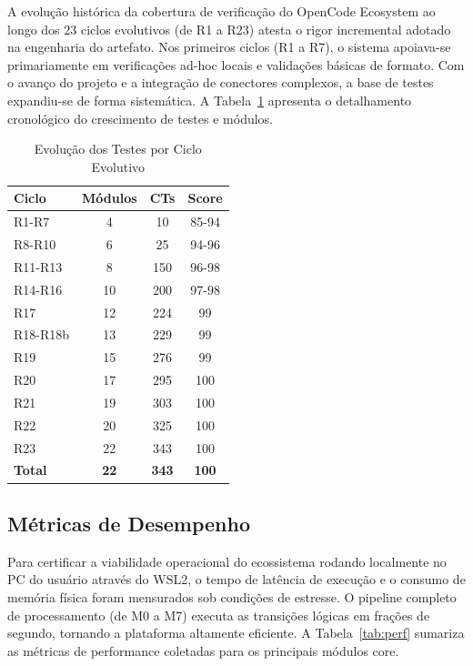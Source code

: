 \documentclass[12pt,a4paper,oneside]{abntex2}
\begin{document}
A evolução histórica da cobertura de verificação do OpenCode Ecosystem ao longo dos 23 ciclos evolutivos (de R1 a R23) atesta o rigor incremental adotado na engenharia do artefato. Nos primeiros ciclos (R1 a R7), o sistema apoiava-se primariamente em verificações ad-hoc locais e validações básicas de formato. Com o avanço do projeto e a integração de conectores complexos, a base de testes expandiu-se de forma sistemática. A Tabela~\ref{tab:evolucao} apresenta o detalhamento cronológico do crescimento de testes e módulos.

\begin{table}[H]
\centering
\small
\caption{Evolução dos Testes por Ciclo Evolutivo}
\label{tab:evolucao}
\begin{tabular}{lccc}
\toprule
\textbf{Ciclo} & \textbf{Módulos} & \textbf{CTs} & \textbf{Score} \\
\midrule
R1-R7 & 4 & 10 & 85-94 \\
R8-R10 & 6 & 25 & 94-96 \\
R11-R13 & 8 & 150 & 96-98 \\
R14-R16 & 10 & 200 & 97-98 \\
R17 & 12 & 224 & 99 \\
R18-R18b & 13 & 229 & 99 \\
R19 & 15 & 276 & 99 \\
R20 & 17 & 295 & 100 \\
R21 & 19 & 303 & 100 \\
R22 & 20 & 325 & 100 \\
R23 & 22 & 343 & 100 \\
\midrule
\textbf{Total} & \textbf{22} & \textbf{343} & \textbf{100} \\
\bottomrule
\end{tabular}
\end{table}

\subsection{Métricas de Desempenho}

Para certificar a viabilidade operacional do ecossistema rodando localmente no PC do usuário através do WSL2, o tempo de latência de execução e o consumo de memória física foram mensurados sob condições de estresse. O pipeline completo de processamento (de M0 a M7) executa as transições lógicas em frações de segundo, tornando a plataforma altamente eficiente. A Tabela~\ref{tab:perf} sumariza as métricas de performance coletadas para os principais módulos core.
\end{document}
